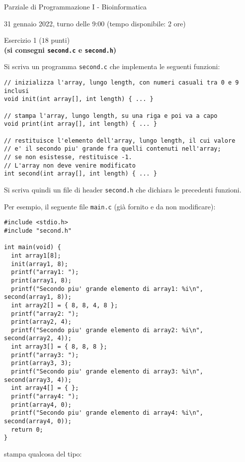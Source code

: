 \documentclass[12pt]{article}
\begin{document}
\begin{center}{\LARGE Parziale di Programmazione I - Bioinformatica}\\
\begin{center}
  \large 31 gennaio 2022, turno delle 9:00 (tempo disponibile: 2 ore)
\end{center}
\end{center}

\vspace*{1ex}
\begin{center}{\Large Esercizio 1} ($18$ punti)\\
  \textbf{(si consegni \texttt{second.c} e \texttt{second.h})}
\end{center}

Si scriva un programma \texttt{second.c} che implementa le seguenti funzioni:

\begin{center}
\begin{lstlisting}[language=myC]
// inizializza l'array, lungo length, con numeri casuali tra 0 e 9 inclusi
void init(int array[], int length) { ... }

// stampa l'array, lungo length, su una riga e poi va a capo
void print(int array[], int length) { ... }

// restituisce l'elemento dell'array, lungo length, il cui valore
// e' il secondo piu' grande fra quelli contenuti nell'array;
// se non esistesse, restituisce -1.
// L'array non deve venire modificato
int second(int array[], int length) { ... }
\end{lstlisting}
\end{center}
%
Si scriva quindi un file di header \texttt{second.h} che dichiara le precedenti funzioni.

Per esempio, il seguente file \texttt{main.c}
(gi\`a fornito e da non modificare):

\begin{center}
  \begin{lstlisting}[language=myC]
#include <stdio.h>
#include "second.h"

int main(void) {
  int array1[8];
  init(array1, 8);
  printf("array1: ");
  print(array1, 8);
  printf("Secondo piu' grande elemento di array1: %i\n", second(array1, 8));
  int array2[] = { 8, 8, 4, 8 };
  printf("array2: ");
  print(array2, 4);
  printf("Secondo piu' grande elemento di array2: %i\n", second(array2, 4));
  int array3[] = { 8, 8, 8 };
  printf("array3: ");
  print(array3, 3);
  printf("Secondo piu' grande elemento di array3: %i\n", second(array3, 4));
  int array4[] = { };
  printf("array4: ");
  print(array4, 0);
  printf("Secondo piu' grande elemento di array4: %i\n", second(array4, 0));
  return 0;
}
  \end{lstlisting}
\end{center}
stampa qualcosa del tipo:
\end{document}
